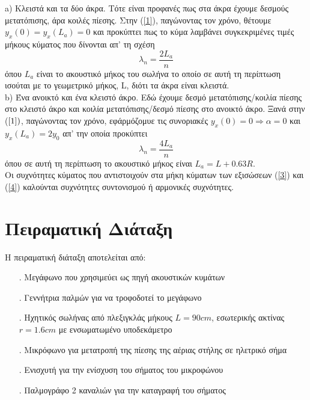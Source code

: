 \documentclass[a4paper]{article}
\begin{document}
a) Κλειστά και τα δύο άκρα. Τότε είναι προφανές πως στα άκρα έχουμε δεσμούς μετατόπισης, άρα κοιλές πίεσης. Στην (\ref{1}), παγώνοντας τον χρόνο, θέτουμε $y_x(0)=y_x(L_a)=0$ και προκύπτει πως το κύμα λαμβάνει συγκεκριμένες τιμές μήκους κύματος που δίνονται απ' τη σχέση 
\begin{equation}\label{3}
\lambda_n = \frac{2L_a}{n}
\end{equation}
όπου $L_a$ είναι το ακουστικό μήκος του σωλήνα το οποίο σε αυτή τη περίπτωση ισούται με το γεωμετρικό μήκος, L, διότι τα άκρα είναι κλειστά. \\ 

b) Ένα ανοικτό και ένα κλειστό άκρο. Εδώ έχουμε δεσμό μετατόπισης/κοιλία πίεσης στο κλειστό άκρο και κοιλία μετατόπισης/δεσμό πίεσης στο ανοικτό άκρο. Ξανά στην ($\ref{1})$, παγώνοντας τον χρόνο, εφάρμόζομυε τις συνοριακές $y_x(0)= 0\Rightarrow \alpha =0$ και  $y_x(L_a)=2y_0$ απ' την οποία προκύπτει
\begin{equation}\label{4}
\lambda_n = \frac{4L_a}{n}
\end{equation}
όπου σε αυτή τη περίπτωση το ακουστικό μήκος είναι $L_a = L+0.63R$.
\\ 

Οι συχνότητες κύματος που αντιστοιχούν στα μήκη κύματων των εξισώσεων (\ref{3}) και (\ref{4}) καλούνται συχνότητες συντονισμού ή αρμονικές συχνότητες.


\section*{Πειραματική Διάταξη}
Η πειραματική διάταξη αποτελείται από:
\begin{itemize}
\item[.] Μεγάφωνο που χρησιμεύει ως πηγή ακουστικών κυμάτων
\item[.] Γεννήτρια παλμών για να τροφοδοτεί το μεγάφωνο
\item[.] Ηχητικός σωλήνας από πλεξιγκλάς μήκους $L=90cm$, εσωτερικής ακτίνας $r=1.6cm$ με ενσωματωμένο υποδεκάμετρο
\item[.] Μικρόφωνο για μετατροπή της πίεσης της αέριας στήλης σε ηλετρικό σήμα
\item[.] Ενισχυτή για την ενίσχυση του σήματος του μικροφώνου
\item[.] Παλμογράφο 2 καναλιών για την καταγραφή του σήματος
\end{itemize}
\end{document}
